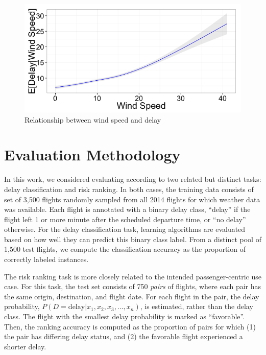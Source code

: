 \documentclass[twocolumn]{article}
\begin{document}
\begin{figure}
    \centering
    \includegraphics[width=\linewidth]{figures/windSpeed.png}
    \caption{Relationship between wind speed and delay}
    \label{fig:wind-speed-delay-relationship}
\end{figure}


\section{Evaluation Methodology}
\label{sec:evaluation-methodology}

In this work, we considered evaluating according to two related but distinct tasks: delay classification and risk ranking. In both cases, the training data consists of set of 3,500 flights randomly sampled from all 2014 flights for which weather data was available. Each flight is annotated with a binary delay class, ``delay'' if the flight left 1 or more minute after the scheduled departure time, or ``no delay'' otherwise. For the delay classification task, learning algorithms are evaluated based on how well they can predict this binary class label. From a distinct pool of 1,500 test flights, we compute the classification accuracy as the proportion of correctly labeled instances.

The risk ranking task is more closely related to the intended passenger-centric use case. For this task, the test set consists of 750 \emph{pairs} of flights, where each pair has the same origin, destination, and flight date. For each flight in the pair, the delay probability, $P(D=\text{delay}|x_1, x_2, x_3, \ldots, x_n)$, is estimated, rather than the delay class. The flight with the smallest delay probability is marked as ``favorable''. Then, the ranking accuracy is computed as the proportion of pairs for which (1) the pair has differing delay status, and (2) the favorable flight experienced a shorter delay.
\end{document}
